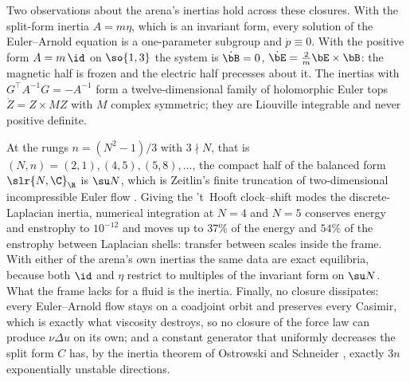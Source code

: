 Two observations about the arena's inertias hold across these closures. With the split-form inertia $A=m\eta$, which is an invariant form, every
solution of the Euler--Arnold equation is a one-parameter subgroup and $\dot p\equiv0$. With the positive form $A=m\,\id$ on $\so{1,3}$ the system is
$\dot\bB=0$, $\dot\bE=\tfrac2m\bE\times\bB$: the magnetic half is frozen and the electric half precesses about it. The inertias with
$G^{\!\top}A^{-1}G=-A^{-1}$ form a twelve-dimensional family of holomorphic Euler tops $\dot Z=Z\times MZ$ with $M$ complex symmetric; they are Liouville
integrable and never positive definite.

At the rungs $n=(N^2-1)/3$ with $3\nmid N$, that is $(N,n)=(2,1),(4,5),(5,8),\dots$, the compact half of the balanced form $\slr{N,\C}_\R$ is $\su N$,
which is Zeitlin's finite truncation of two-dimensional incompressible Euler flow \cite{Zeitlin91}. Giving the 't~Hooft clock--shift modes the
discrete-Laplacian inertia, numerical integration at $N=4$ and $N=5$ conserves energy and enstrophy to $10^{-12}$ and moves up to $37\%$ of the
energy and $54\%$ of the enstrophy between Laplacian shells: transfer between scales inside the frame. With either of the arena's own inertias the same
data are exact equilibria, because both $\id$ and $\eta$ restrict to multiples of the invariant form on $\su N$. What the frame lacks for a fluid is
the inertia. Finally, no closure dissipates: every Euler--Arnold flow stays on a coadjoint orbit and preserves every Casimir, which is exactly what
viscosity destroys, so no closure of the force law can produce $\nu\Delta u$ on its own; and a constant generator that uniformly decreases the split
form $C$ has, by the inertia theorem of Ostrowski and Schneider \cite{OstrowskiSchneider62}, exactly $3n$ exponentially unstable directions.

